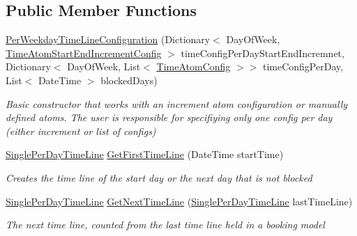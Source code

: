 \subsection*{Public Member Functions}
\begin{DoxyCompactItemize}
\item 
\hyperlink{class_general_health_care_elements_1_1_booking_models_1_1_per_weekday_time_line_configuration_a87d822b2ee21b2e40a6a8b9419dd2edb}{Per\+Weekday\+Time\+Line\+Configuration} (Dictionary$<$ Day\+Of\+Week, \hyperlink{class_general_health_care_elements_1_1_booking_models_1_1_time_atom_start_end_increment_config}{Time\+Atom\+Start\+End\+Increment\+Config} $>$ time\+Config\+Per\+Day\+Start\+End\+Incremnet, Dictionary$<$ Day\+Of\+Week, List$<$ \hyperlink{class_general_health_care_elements_1_1_booking_models_1_1_time_atom_config}{Time\+Atom\+Config} $>$$>$ time\+Config\+Per\+Day, List$<$ Date\+Time $>$ blocked\+Days)
\begin{DoxyCompactList}\small\item\em Basic constructor that works with an increment atom configuration or manually defined atoms. The user is responsible for specifiying only one config per day (either increment or list of configs) \end{DoxyCompactList}\item 
\hyperlink{class_general_health_care_elements_1_1_booking_models_1_1_single_per_day_time_line}{Single\+Per\+Day\+Time\+Line} \hyperlink{class_general_health_care_elements_1_1_booking_models_1_1_per_weekday_time_line_configuration_ac80102ea3ad68bb0841512f3d47ad2b6}{Get\+First\+Time\+Line} (Date\+Time start\+Time)
\begin{DoxyCompactList}\small\item\em Creates the time line of the start day or the next day that is not blocked \end{DoxyCompactList}\item 
\hyperlink{class_general_health_care_elements_1_1_booking_models_1_1_single_per_day_time_line}{Single\+Per\+Day\+Time\+Line} \hyperlink{class_general_health_care_elements_1_1_booking_models_1_1_per_weekday_time_line_configuration_a4c2df853ac8d87c64279bb444c3980f9}{Get\+Next\+Time\+Line} (\hyperlink{class_general_health_care_elements_1_1_booking_models_1_1_single_per_day_time_line}{Single\+Per\+Day\+Time\+Line} last\+Time\+Line)
\begin{DoxyCompactList}\small\item\em The next time line, counted from the last time line held in a booking model \end{DoxyCompactList}\end{DoxyCompactItemize}
